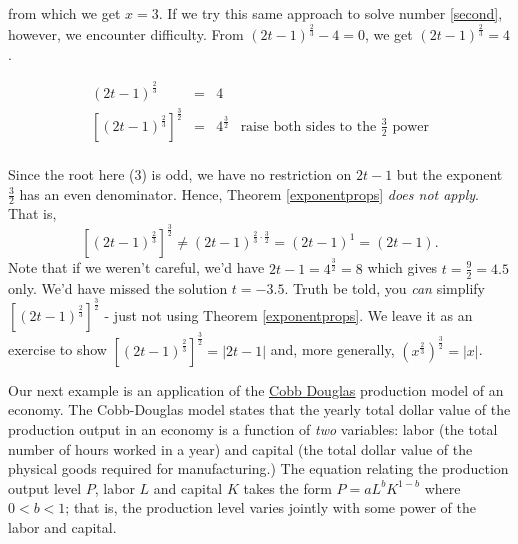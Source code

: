 from which we get $x = 3$.  If we try this same approach to solve number \ref{second}, however, we encounter difficulty.  From $(2t-1)^{\frac{2}{3}} -4 = 0$, we get $(2t-1)^{\frac{2}{3}}  =4$.  

\[ \begin{array}{rclr}  

(2t-1)^{\frac{2}{3}} & = & 4 & \\

 \left[(2t-1)^{\frac{2}{3}}  \right]^{\frac{3}{2}} & = & 4^{\frac{3}{2}}& \text{raise both sides to the $\frac{3}{2}$ power} \\ \end{array} \]
 
 Since the root here ($3$) is odd, we have no restriction on $2t-1$ but the exponent $\frac{3}{2}$ has an even denominator.  Hence, Theorem \ref{exponentprops} \textit{does not apply}.  That is, \[\left[(2t-1)^{\frac{2}{3}}  \right]^{\frac{3}{2}} \neq (2t-1)^{\frac{2}{3} \cdot \frac{3}{2}} = (2t-1)^{1} = (2t-1).\]
 Note that if we weren't careful, we'd have $2t-1 = 4^{\frac{3}{2}} = 8$ which gives $t= \frac{9}{2} = 4.5$ only.   We'd have missed the solution $t = -3.5$.  Truth be told, you \textit{can} simplify $\left[(2t-1)^{\frac{2}{3}}  \right]^{\frac{3}{2}} $ - just not using Theorem \ref{exponentprops}.  We leave it as an exercise to show  $\left[(2t-1)^{\frac{2}{3}}  \right]^{\frac{3}{2}} = |2t-1|$ and, more generally, $\left(x^{\frac{2}{3}}\right)^{\frac{3}{2}} = |x|$.
 
 Our next example is an application of the  \href{https://en.wikipedia.org/wiki/Cobb-Douglas_production_function}{\underline{Cobb Douglas}} production model of an economy.  The Cobb-Douglas model states that the yearly total dollar value of the production output in an economy is a function of \textit{two} variables:   labor (the total number of hours worked in a year) and capital (the total dollar value of the physical goods required for manufacturing.) The equation relating the production output level $P$, labor $L$ and capital $K$ takes the form $P = a L^{b} K^{1-b}$ where $0 < b < 1$; that is, the production level varies jointly with some power of the labor and capital.  

